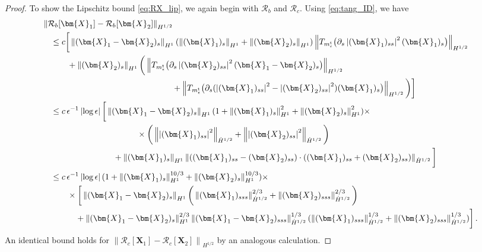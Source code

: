 \documentclass[11pt,reqno]{amsart}
\newcommand{\X}{\bm{X}}
\newcommand{\p}{\partial}
\newcommand{\abs}[1]{\left\lvert #1 \right\rvert}
\newcommand{\norm}[1]{\left\lVert #1 \right\rVert}
\newcommand{\mc}[1]{\mathcal{#1}}
\numberwithin{equation}{section}
\theoremstyle{definition}
\begin{document}
\begin{proof}
To show the Lipschitz bound \eqref{eq:RX_lip}, we again begin with $\mc{R}_b$ and $\mc{R}_c$. Using \eqref{eq:tang_ID}, we have
\begin{equation}
\begin{aligned}
  &\norm{\mc{R}_b[\X_1]-\mc{R}_b[\X_2]}_{H^{1/2}}\\
  &\quad \le  
  c\bigg[\norm{(\X_1-\X_2)_s}_{H^1}(\norm{(\X_1)_s}_{H^1}+\norm{(\X_2)_s}_{H^1})\norm{T_{m_\epsilon^{\rm t}}\big(\p_s\abs{(\X_1)_{ss}}^2(\X_1)_s\big)}_{H^{1/2}}\\
  &\qquad\quad +\norm{(\X_2)_s}_{H^1} \bigg(\norm{T_{m_\epsilon^{\rm t}}\big(\p_s\abs{(\X_2)_{ss}}^2(\X_1-\X_2)_s\big)}_{H^{1/2}} \\ 
  &\hspace{5.5cm}+\norm{T_{m_\epsilon^{\rm t}}\big(\p_s(\abs{(\X_1)_{ss}}^2-\abs{(\X_2)_{ss}}^2)(\X_1)_s\big)}_{H^{1/2}}\bigg) \bigg] \\
  &\quad \le c\,\epsilon^{-1}\abs{\log\epsilon}\bigg[\norm{(\X_1-\X_2)_s}_{H^1}(1+\norm{(\X_1)_s}_{H^1}^2+\norm{(\X_2)_s}_{H^1}^2)\times\\
  &\hspace{4cm} \times \bigg(\norm{\abs{(\X_1)_{ss}}^2}_{\dot H^{1/2}}+\norm{\abs{(\X_2)_{ss}}^2}_{\dot H^{1/2}}\bigg)\\
  &\hspace{3cm} + \norm{(\X_1)_s}_{H^1}\norm{((\X_1)_{ss}-(\X_2)_{ss})\cdot((\X_1)_{ss}+(\X_2)_{ss})}_{\dot H^{1/2}} \bigg] \\
  &\quad \le c\,\epsilon^{-1}\abs{\log\epsilon}(1+\norm{(\X_1)_s}_{H^1}^{10/3}+\norm{(\X_2)_s}_{H^1}^{10/3})\times\\
  &\qquad\quad \times \bigg[\norm{(\X_1-\X_2)_s}_{H^1}\bigg(\norm{(\X_1)_{sss}}_{\dot H^{1/2}}^{2/3}+\norm{(\X_2)_{sss}}_{\dot H^{1/2}}^{2/3}\bigg)\\
  &\qquad\qquad + \norm{(\X_1-\X_2)_s}_{H^1}^{2/3}\norm{(\X_1-\X_2)_{sss}}_{\dot H^{1/2}}^{1/3}(\norm{(\X_1)_{sss}}_{\dot H^{1/2}}^{1/3}+\norm{(\X_2)_{sss}}_{\dot H^{1/2}}^{1/3} )\bigg] \,.
\end{aligned}
\end{equation}
%
An identical bound holds for $\norm{\mc{R}_c[\X_1]-\mc{R}_c[\X_2]}_{H^{1/2}}$ by an analogous calculation. 



\end{proof}
\end{document}
